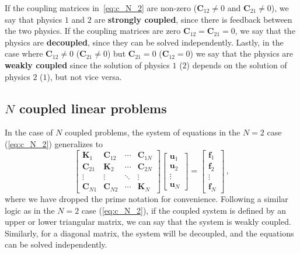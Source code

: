 If the coupling
 matrices in~\eqref{eq:c_N_2} are non-zero ($\mathbf{C}_{12}\neq 0$ and $\mathbf{C}_{21}\neq 0$), we
 say that physics $1$ and $2$ are
    \textbf{strongly coupled}, since there is feedback between the two physics. If the
 coupling matrices are zero $\mathbf{C}_{12}=\mathbf{C}_{21}=0$, we say that the
 physics
 are \textbf{decoupled}, since they can be solved independently. Lastly, in the
 case where $\mathbf{C}_{12}\neq 0$ ($\mathbf{C}_{21}\neq 0$) but $\mathbf{C}_{21} = 0$ ($\mathbf{C}_{12} = 0$) we say that the
 physics are \textbf{weakly
 coupled} since the solution of physics $1$ ($2$) depends on the solution of physics
$2$ ($1$), but not vice versa.

\subsection*{$N$ coupled linear problems}

 In the case of $N$ coupled problems, the system of equations in the $N=2$ case (\eqref{eq:c_N_2}) generalizes to
    \begin{equation} \label{eq:multiphysics_strong}
        \begin{bmatrix}
 \mathbf{K}_1    & \mathbf{C}_{12} & \cdots & \mathbf{C}_{1N} \\
 \mathbf{C}_{21} & \mathbf{K}_2    & \cdots & \mathbf{C}_{2N} \\
            \vdots          & \vdots          & \ddots & \vdots          \\
 \mathbf{C}_{N1} & \mathbf{C}_{N2} & \cdots & \mathbf{K}_N
        \end{bmatrix}
        \begin{bmatrix}
 \mathbf{u}_1 \\
 \mathbf{u}_2 \\
            \vdots       \\
 \mathbf{u}_N
        \end{bmatrix}
 =
        \begin{bmatrix}
 \mathbf{f}_1 \\
 \mathbf{f}_2 \\
            \vdots       \\
 \mathbf{f}_N
        \end{bmatrix}\,,
    \end{equation}
 where we have dropped the prime notation for convenience. Following a similar logic as in the $N=2$ case (\eqref{eq:c_N_2}), if
 the coupled
 system is defined by an upper or lower triangular matrix, we can say that the
 system is weakly coupled. 
 Similarly, for a diagonal matrix, the system will be decoupled, and the equations can be
 solved independently.

